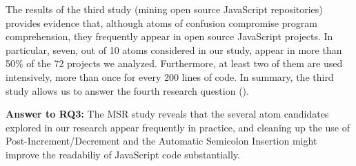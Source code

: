 
The results of the third study (mining open source
JavaScript repositories) provides evidence that,
although atoms of confusion compromise program
comprehension, they frequently appear in open
source JavaScript projects. In particular,
seven, out of 10 atoms considered
  in our study, appear in more than 50\% of
the 72 projects we analyzed. Furthermore, at least two of them are used intensively, more than once for every 200 lines of code. In summary, the third study
allows us to answer the fourth research
question (\emph{\rqd}).


\begin{mh}
  {\bf Answer to RQ3:} The MSR study reveals that
  the several atom candidates explored in our research
  appear frequently in practice, and cleaning up the use of 
  Post-Increment/Decrement and the Automatic Semicolon Insertion
  might improve the readabiliy of JavaScript code substantially. 
\end{mh}






